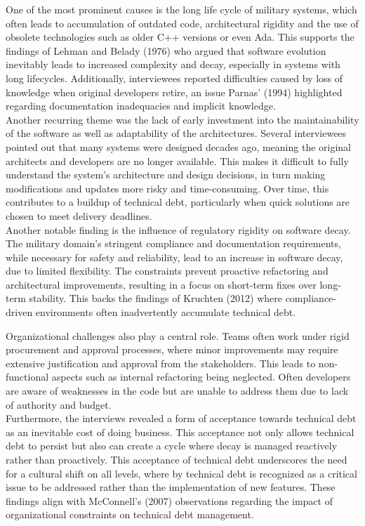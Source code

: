 One of the most prominent causes is the long life cycle of military systems, which often leads to accumulation of outdated code, architectural rigidity and the use of obsolete technologies such as older C++ versions or even Ada.
This supports the findings of Lehman and Belady (1976) who argued that software evolution inevitably leads to increased complexity and decay, especially in systems with long lifecycles.
Additionally, interviewees reported difficulties caused by loss of knowledge when original developers retire, an issue Parnas' (1994) highlighted regarding documentation inadequacies and implicit knowledge.\\

Another recurring theme was the lack of early investment into the maintainability of the software as well as adaptability of the architectures. Several interviewees pointed out that many systems were designed decades ago, meaning the original architects and developers are no longer available.
This makes it difficult to fully understand the system's architecture and design decisions, in turn making modifications and updates more risky and time-consuming. Over time, this contributes to a buildup of technical debt, particularly when quick solutions are chosen to meet delivery deadlines.\\

Another notable finding is the influence of regulatory rigidity on software decay. The military domain's stringent compliance and documentation requirements, while necessary for safety and reliability, lead to an increase in software decay, due to limited flexibility.
The constraints prevent proactive refactoring and architectural improvements, resulting in a focus on short-term fixes over long-term stability. This backs the findings of Kruchten (2012) where compliance-driven environments often inadvertently accumulate technical debt.

Organizational challenges also play a central role. Teams often work under rigid procurement and approval processes, where minor improvements may require extensive justification and approval from the stakeholders. This leads to non-functional aspects such as internal refactoring being neglected.
Often developers are aware of weaknesses in the code but are unable to address them due to lack of authority and budget.\\
Furthermore, the interviews revealed a form of acceptance towards technical debt as an inevitable cost of doing business. This acceptance not only allows technical debt to persist but also can create a cycle where decay is managed reactively rather than proactively.
This acceptance of technical debt underscores the need for a cultural shift on all levels, where by technical debt is recognized as a critical issue to be addressed rather than the implementation of new features. These findings align with McConnell's (2007) observations regarding 
the impact of organizational constraints on technical debt management.\\

